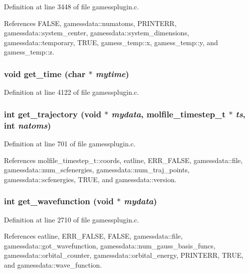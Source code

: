 Definition at line 3448 of file gamessplugin.c.

References FALSE, gamessdata::numatoms, PRINTERR, gamessdata::system\_\-center, gamessdata::system\_\-dimensions, gamessdata::temporary, TRUE, gamess\_\-temp::x, gamess\_\-temp::y, and gamess\_\-temp::z.
\subsubsection{\setlength{\rightskip}{0pt plus 5cm}void get\_\-time (char $\ast$ {\em mytime})}\label{gamessplugin_8c_a37}




Definition at line 4122 of file gamessplugin.c.
\subsubsection{\setlength{\rightskip}{0pt plus 5cm}int get\_\-trajectory (void $\ast$ {\em mydata}, {\bf molfile\_\-timestep\_\-t} $\ast$ {\em ts}, int {\em natoms})}\label{gamessplugin_8c_a14}




Definition at line 701 of file gamessplugin.c.

References molfile\_\-timestep\_\-t::coords, eatline, ERR\_\-FALSE, gamessdata::file, gamessdata::num\_\-scfenergies, gamessdata::num\_\-traj\_\-points, gamessdata::scfenergies, TRUE, and gamessdata::version.
\subsubsection{\setlength{\rightskip}{0pt plus 5cm}int get\_\-wavefunction (void $\ast$ {\em mydata})}\label{gamessplugin_8c_a26}




Definition at line 2710 of file gamessplugin.c.

References eatline, ERR\_\-FALSE, FALSE, gamessdata::file, gamessdata::got\_\-wavefunction, gamessdata::num\_\-gauss\_\-basis\_\-funcs, gamessdata::orbital\_\-counter, gamessdata::orbital\_\-energy, PRINTERR, TRUE, and gamessdata::wave\_\-function.
